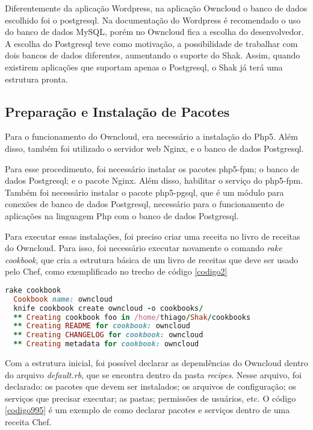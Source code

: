 Diferentemente da aplicação Wordpress, na aplicação Owncloud o 
banco de dados escolhido foi o postgresql. Na documentação do Wordpress é recomendado
o uso do banco de dados MySQL, porém no Owncloud fica a escolha do desenvolvedor.
A escolha do Postgresql teve como motivação, a possibilidade de trabalhar com dois bancos de
dados diferentes, aumentando o suporte do Shak. Assim, quando existirem aplicações
que suportam apenas o Postgresql, o Shak já terá uma estrutura pronta.

\subsection{Preparação e Instalação de Pacotes}

Para o funcionamento do Owncloud, era necessário a instalação do Php5. Além
disso, também foi utilizado o servidor web Nginx, e o 
banco de dados Postgresql.

Para esse procedimento, foi necessário instalar os pacotes php5-fpm; o banco
de dados Postgresql; e o pacote Nginx. Além disso, habilitar o serviço do php5-fpm. 
Também foi necessário instalar o pacote php5-pgsql, que é um módulo para
conexões de banco de dados Postgresql, necessário para o funcionamento de
aplicações na linguagem Php com o banco de dados Postgresql.

Para executar essas instalações, foi preciso criar uma receita no livro de receitas
do Owncloud. Para isso, foi necessário executar novamente o comando \textit{rake cookbook}, 
que cria a estrutura básica de um livro de receitas que deve ser usado pelo Chef, 
como exemplificado no trecho de código \ref{codigo2}

\begin{lstlisting}[language=Ruby,label=dice_index,caption={Exemplo de criação de estrutura básica de livro de receitas do Owncloud com Shak}, label=codigo2]
  rake cookbook
  Cookbook name: owncloud
  knife cookbook create owncloud -o cookbooks/
  ** Creating cookbook foo in /home/thiago/Shak/cookbooks
  ** Creating README for cookbook: owncloud
  ** Creating CHANGELOG for cookbook: owncloud
  ** Creating metadata for cookbook: owncloud
\end{lstlisting}

Com a estrutura inicial, foi possível declarar as dependências do Owncloud
dentro do arquivo \textit{default.rb}, que se encontra dentro da pasta 
\textit{recipes}. Nesse arquivo, foi 
declarado: os pacotes que devem ser instalados; os arquivos de configuração;
os serviços que precisar executar; as pastas; permissões de usuários, etc. O código
\ref{codigo995} é um exemplo
de como declarar pacotes e serviços dentro de uma receita Chef.

